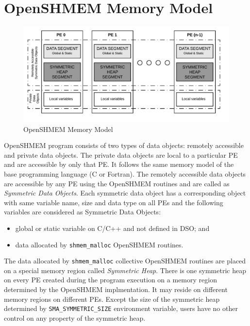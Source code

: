 \section{OpenSHMEM Memory Model}
\label{src:mmodel}
\begin{figure}[!h]
    \vspace{-30pt}
    \hspace*{5mm}
    \includegraphics[scale=0.20]{image/osm-mmodel.png}
    \vspace{-25pt}
    \caption{OpenSHMEM Memory Model}
    \vspace{-20pt}
    \label{fig:mmodel}
\end{figure}

OpenSHMEM program consists of two types of data objects: remotely
accessible and private data objects. The private data objects are local
to a particular PE and are accessible by only that PE. It follows the
same memory model of the base programming language (C or Fortran). The
remotely accessible data objects are accessible by any PE using the
OpenSHMEM routines and are called as \emph{Symmetric Data Objects}.
Each symmetric data object has a corresponding object with same variable
name, size and data type on all PEs and the following variables are
considered as Symmetric Data Objects:
\begin{itemize}
    \item global or static variable on C/C++ and not defined in DSO; and
    \item data allocated by \texttt{shmem\_malloc} OpenSHMEM routines.
\end{itemize}

The data allocated by \texttt{shmem\_malloc} collective OpenSHMEM
routines are placed on a special memory region called \emph{Symmetric
Heap}. There is one symmetric heap on every PE created during the program
execution on a memory region determined by the OpenSHMEM implmentation.
It may reside on different memory regions on different PEs. Except the
size of the symmetric heap determined by \texttt{SMA\_SYMMETRIC\_SIZE}
environment variable, users have no other control on any property of
the symmetric heap.

